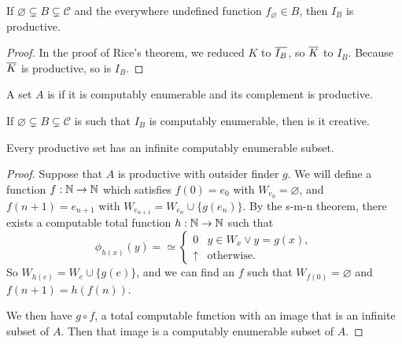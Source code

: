 
\begin{theorem}
  If $\varnothing \subsetneq B \subsetneq \mathcal{C}$ and the everywhere
  undefined function $f_\varnothing \in B$, then $I_B$ is productive.
\end{theorem}

\begin{proof}
  In the proof of Rice's theorem, we reduced $K$ to $\overline{I_B}$, so $\overline{K}$ to
  $I_B$.
  Because $\overline{K}$ is productive, so is $I_B$.
\end{proof}

\begin{definition}
  A set $A$ is  if it is computably enumerable and its
  complement is productive.
\end{definition}

\begin{theorem}
  If $\varnothing \subsetneq B \subsetneq \mathcal{C}$ is such that $I_B$ is
  computably enumerable, then is it creative.
\end{theorem}

\begin{theorem}
  Every productive set has an infinite computably enumerable subset.
\end{theorem}

\begin{proof}
  Suppose that $A$ is productive with outsider finder $g$.
  We will define a function $f: \mathbb{N} \to \mathbb{N}$ which satisfies $f(0) = e_0$ with
  $W_{e_0} = \varnothing$, and $f(n+1) = e_{n+1}$ with $W_{e_{n+1}} = W_{e_n}
  \cup \{g(e_n)\}$.
  By the s-m-n theorem, there exists a computable total function $h: \mathbb{N} \to \mathbb{N}$
  such that
  \[
	\phi_{h(x)}(y) = \simeq
	\begin{cases}
	  0 & y \in W_x \lor y = g(x), \\
	  \uparrow & \text{otherwise.}
	\end{cases}
  \]
  So $W_{h(e)} = W_e \cup \{g(e)\}$, and we can find an $f$ such that $W_{f(0)}
  = \varnothing$ and $f(n+1) = h(f(n))$.

  We then have $g \circ f$, a total computable function with an image that is an
  infinite subset of $A$.
  Then that image is a computably enumerable subset of $A$.
\end{proof}


